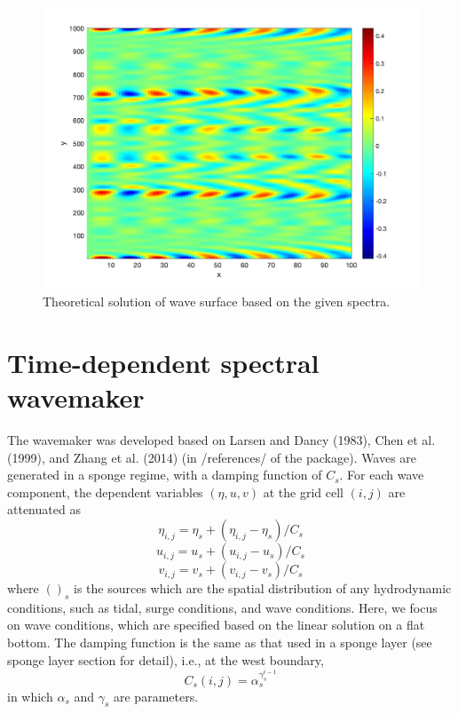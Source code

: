 \documentclass[preprint,10pt]{elsarticle}
\newcommand{\be}{\begin{equation}}
\newcommand{\ee}{\end{equation}}
\begin{document}
 \begin{figure}
\begin{center}
 \includegraphics[width=1.0\textwidth]{figures/theory.jpg}
 \caption{Theoretical solution of wave surface based on the given spectra.}
 \label{theoretical}
 \end{center}
 \end{figure}

\section{Time-dependent spectral wavemaker}

The wavemaker was developed based on Larsen and Dancy (1983), Chen et al. (1999), and Zhang et al. (2014) (in /references/ of the package). Waves are generated in a sponge regime, with a damping function of $C_s$. For each wave component, the dependent variables $(\eta, u, v)$ at the grid cell $(i,j)$ are attenuated as
\be
\eta_{i,j} = \eta_{s} + (\eta_{i,j}  - \eta_{s})/C_s
\ee
\be
u_{i,j}  = u_{s} + (u_{i,j}  - u_{s})/C_s
\ee
\be
v_{i,j}  = v_{s} + (v_{i,j}  - v_{s})/C_s
\ee
where $( )_{s}$ is the sources which are  the spatial distribution of any hydrodynamic conditions, such as tidal, surge conditions, and wave conditions. Here, we focus on wave conditions, which are specified based on the linear solution on a flat bottom. The damping function is the   
 same as that used in a sponge layer (see sponge layer section for detail), i.e., at the west boundary,
 \be
 C_s (i,j) = \alpha_s^{\gamma_s^{i-1}}
 \ee
 in which $\alpha_s$ and $\gamma_s$ are parameters. 
 
\end{document}
